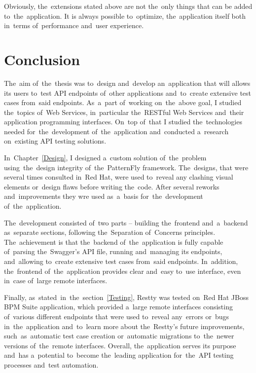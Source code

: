 Obviously, the~extensions stated above are not the~only things that can be added to~the~application. It is always possible to~optimize,
the~application itself both in~terms of~performance and~user experience.

\chapter{Conclusion}
The~aim of~the~thesis was to~design and~develop an~application that will allows its users
to~test API endpoints of~other applications and~to~create extensive test cases from~said endpoints.
As~a~part of~working on~the~above goal, I studied the~topics of~Web Services, in~particular the~RESTful
Web Services and~their application programming interfaces. On~top of~that I studied the~technologies needed
for~the~development of~the~application and~conducted a~research on~existing API testing solutions.

In~Chapter~\ref{Design}, I designed a~custom solution of~the~problem using~the~design integrity of~the~PatternFly
framework. The~designs, that were several times consulted in~Red Hat, were used to~reveal any clashing visual elements
or~design flaws before writing the~code. After several reworks and~improvements they wre used as~a~basis
for~the~development of~the~application.

The~development consisted of~two parts -- building the~frontend and~a~backend as~separate sections, following the~Separation
of~Concerns principles. The~achievement is that the~backend of~the~application is fully capable of~parsing the~Swagger's API 
file, running and~managing its endpoints, and~allowing to~create extensive test cases from~said endpoints. In~addition,
the~frontend of~the~application provides clear and~easy to~use interface, even in~case of~large remote interfaces.

Finally, as~stated~in~the~section~\ref{Testing}, Restty was tested on~Red Hat JBoss BPM Suite application, which provided
a~large remote interfaces consisting of~various different endpoints that were used to~reveal any~errors or~bugs in~the~application
and~to~learn more about the~Restty's future improvements, such~as~automatic test case creation or~automatic migrations to~the~newer
versions of~the~remote interfaces. Overall, the~application serves its purpose and~has a~potential to~become the~leading application
for~the~API testing processes and~test automation.




